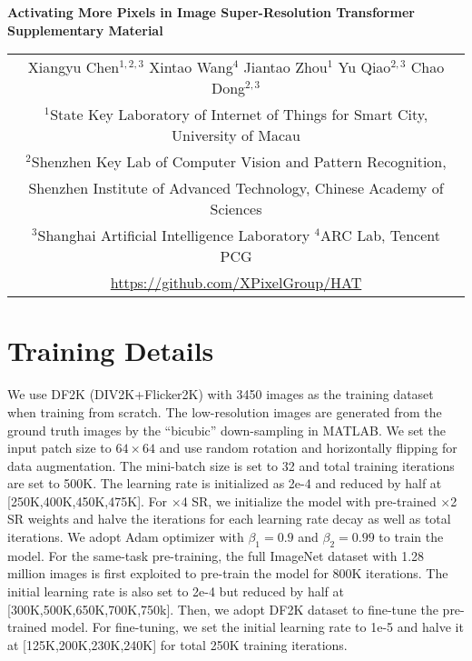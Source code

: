 \documentclass[10pt,twocolumn,letterpaper]{article}
\begin{document}
\begin{minipage}{2\linewidth}
   \begin{center}
      \setlength\parindent{0pt}
      {\Large \bf  Activating More Pixels in Image Super-Resolution Transformer\\
      Supplementary Material\par}
            \vspace*{24pt}
      {
      \large
      \begin{tabular}[t]{c}
        Xiangyu Chen$^{1,2,3}$ \quad Xintao Wang$^{4}$ \quad
        Jiantao Zhou$^{1}$ \quad Yu Qiao$^{2,3}$ \quad Chao Dong$^{2,3}$\\[0.4em]
        $^1$State Key Laboratory of Internet of Things for Smart City, University of Macau\\
        $^2$Shenzhen Key Lab of Computer Vision and Pattern Recognition, \\Shenzhen Institute of Advanced Technology, Chinese Academy of Sciences\\
        $^3$Shanghai Artificial Intelligence Laboratory\quad
        $^4$ARC Lab, Tencent PCG\\
        [0.4em] \url{https://github.com/XPixelGroup/HAT}
        \vspace*{0.5cm}
      \end{tabular}
      \par
      }
   \end{center}
\end{minipage}


\section{Training Details}
We use DF2K (DIV2K+Flicker2K) with 3450 images as the training dataset when training from scratch. The low-resolution images are generated from the ground truth images by the ``bicubic'' down-sampling in MATLAB. We set the input patch size to $64\times 64$ and use random rotation and horizontally flipping for data augmentation. The mini-batch size is set to 32 and total training iterations are set to 500K. The learning rate is initialized as 2e-4 and reduced by half at [250K,400K,450K,475K]. For $\times$4 SR, we initialize the model with pre-trained $\times$2 SR weights and halve the iterations for each learning rate decay as well as total iterations. We adopt Adam optimizer with $\beta_1=0.9$ and $\beta_2=0.99$ to train the model. For the same-task pre-training, the full ImageNet dataset with 1.28 million images is first exploited to pre-train the model for 800K iterations. The initial learning rate is also set to 2e-4 but reduced by half at [300K,500K,650K,700K,750k]. Then, we adopt DF2K dataset to fine-tune the pre-trained model. For fine-tuning, we set the initial learning rate to 1e-5 and halve it at [125K,200K,230K,240K] for total 250K training iterations. 
\end{document}
